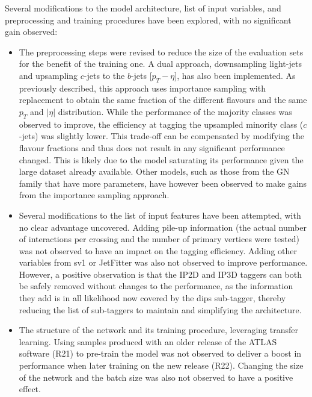 Several modifications to the model architecture, list of input variables, and preprocessing and training procedures have been explored, with no significant gain observed:
\begin{itemize}
\item The preprocessing steps were revised to reduce the size of the evaluation sets for the benefit of the training one. A dual approach, downsampling light-jets and upsampling $c$-jets to the $b$-jets [$p_T - \eta$], has also been implemented. As previously described, this approach uses importance sampling with replacement to obtain the same fraction of the different flavours and the same $p_T$ and $|\eta|$ distribution. While the performance of the majority classes was observed to improve, the efficiency at tagging the upsampled minority class ($c$-jets) was slightly lower. This trade-off can be compensated by modifying the flavour fractions and thus does not result in any significant performance changed. This is likely due to the model saturating its performance given the large dataset already available. Other models, such as those from the GN family that have more parameters, have however been observed to make gains from the importance sampling approach.
\item Several modifications to the list of input features have been attempted, with no clear advantage uncovered. Adding pile-up information (the actual number of interactions per crossing and the number of primary vertices were tested) was not observed to have an impact on the tagging efficiency. Adding other variables from \gls{sv1} or JetFitter was also not observed to improve performance. However, a positive observation is that the IP2D and IP3D taggers can both be safely removed without changes to the performance, as the information they add is in all likelihood now covered by the \gls{dips} sub-tagger, thereby reducing the list of sub-taggers to maintain and simplifying the architecture.
\item The structure of the network and its training procedure, leveraging transfer learning. Using samples produced with an older release of the ATLAS software (R21) to pre-train the model was not observed to deliver a boost in performance when later training on the new release (R22). Changing the size of the network and the batch size was also not observed to have a positive effect.
\end{itemize}

